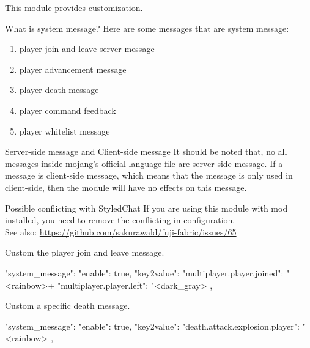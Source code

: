 
This module provides  customization.

\begin{note}{What is system message?}
    Here are some messages that are system message:
    \begin{enumerate}
        \item player join and leave server message
        \item player advancement message
        \item player death message
        \item player command feedback
        \item player whitelist message
    \end{enumerate}
\end{note}

\begin{note}{Server-side message and Client-side message}
    It should be noted that, no all messages inside \href{https://github.com/sakurawald/fuji-fabric/blob/dev/.github/files/en_us.json}{mojang's official language file} are server-side message.
    If a message is client-side message, which means that the message is only used in client-side, then the module will have no effects on this message.
\end{note}

\begin{warn}{Possible conflicting with StyledChat}
    If you are using this module with  mod installed, you need to remove the conflicting  in  configuration. \\
    See also: \url{https://github.com/sakurawald/fuji-fabric/issues/65}
\end{warn}

\begin{example}{Custom the player join and leave message.}
    \begin{json}
        "system_message": {
            "enable": true,
            "key2value": {
                "multiplayer.player.joined": "<rainbow>+ %
                "multiplayer.player.left": "<dark_gray>%
            }
        },
    \end{json}

\end{example}

\begin{example}{Custom a specific death message.}
    \begin{json}
        "system_message": {
            "enable": true,
            "key2value": {
                "death.attack.explosion.player": "<rainbow>%
            }
        },
    \end{json}
\end{example}

